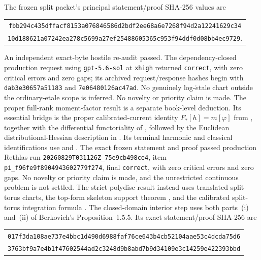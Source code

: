 The frozen split packet's principal statement/proof SHA-256 values are
\begin{center}
\small
\begin{tabular}{@{}c@{}}
\nolinkurl{fbb294c435dffacf8153a076846586d2bdf2ee68a6e7268f94d2a12241629c34}\\
\nolinkurl{10d188621a07242ea278c5699a27ef25488605365c953f94ddf0d08bb4ec9729}.
\end{tabular}
\end{center}
An independent exact-byte hostile re-audit passed.  The dependency-closed
production request using \texttt{gpt-5.6-sol} at \texttt{xhigh} returned
\texttt{correct}, with zero critical errors and zero gaps; its archived
request/response hashes begin with \texttt{dab3e30657a51183} and
\texttt{7e06480126ac47ad}.  No genuinely log-\(\acute{e}\)tale chart outside
the ordinary-etale scope is inferred.  No novelty or priority claim is made.
The proper full-rank moment-factor result
 is a separate book-level deduction.
Its essential bridge is the proper calibrated-current identity
\(F_*[h]=m[\varphi]\) from \cite[Proposition~5.10.1 and \S7.1.11]{CLD25},
together with the differential functoriality of \cite[\S7.7.8]{CLD25},
followed by the Euclidean distributional-Hessian description in
\cite[\S1.6.4 and Proposition~8.3.2]{CLD25}.  Its terminal harmonic and
classical identifications use \cite[Definition~7.2 and
Remark~7.3(5),(6)]{GJR26} and
\cite[Proposition~7.2(2),(3)]{GR25Classical}.  The exact frozen statement and
proof passed production Rethlas run
\nolinkurl{20260829T031126Z_75e9cb498ce4}, item
\nolinkurl{pi_f96fe9f8904943602779f274}, final \texttt{correct}, with zero
critical errors and zero gaps.  No novelty or priority claim is made, and the
unrestricted continuous problem is not settled.
The strict-polydisc result
 instead uses translated
split-torus charts, the top-form skeleton support theorem
\cite[Proposition~2.3.6]{BGJKK25}, and the calibrated split-torus integration
formula \cite[Proposition~11.1 and Example~11.7]{GJR26}.  The closed-domain
interior step uses both parts~(i) and~(ii) of Berkovich's
Proposition~1.5.5.  Its exact statement/proof SHA-256 are
\begin{center}
\small
\begin{tabular}{@{}c@{}}
\nolinkurl{017f3da108ae737e4bbc1d490d6988faf76ce643b4cb52104aae53c4dcda75d6}\\
\nolinkurl{3763bf9a7e4b1f47602544ad2c3248d9b8abd7b9d34109e3c14259e422393bbd}
\end{tabular}
\end{center}
